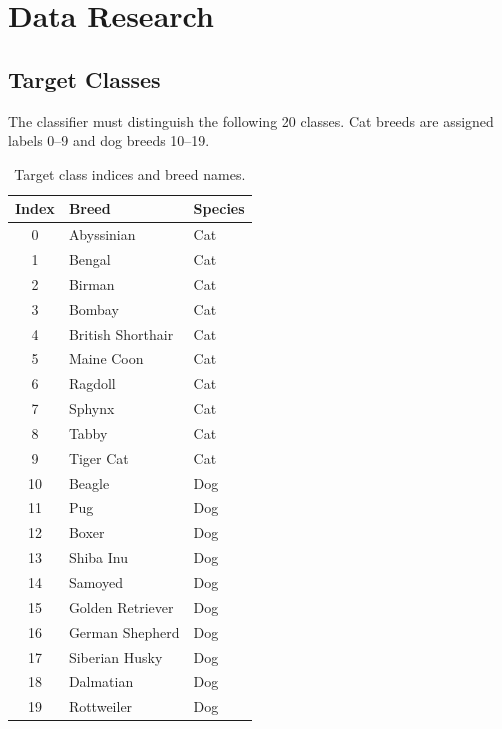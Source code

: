 \documentclass[10pt,twocolumn,letterpaper]{article}
\begin{document}
\section{Data Research}

\subsection{Target Classes}

The classifier must distinguish the following 20 classes. Cat breeds are assigned labels 0--9 and dog breeds 10--19.

\begin{table}[h]
\centering
\small
\caption{Target class indices and breed names.}
\label{tab:classes}
\begin{tabular}{cll}
\toprule
\textbf{Index} & \textbf{Breed} & \textbf{Species} \\
\midrule
0  & Abyssinian        & Cat \\
1  & Bengal            & Cat \\
2  & Birman            & Cat \\
3  & Bombay            & Cat \\
4  & British Shorthair & Cat \\
5  & Maine Coon        & Cat \\
6  & Ragdoll           & Cat \\
7  & Sphynx            & Cat \\
8  & Tabby             & Cat \\
9  & Tiger Cat         & Cat \\
\midrule
10 & Beagle            & Dog \\
11 & Pug               & Dog \\
12 & Boxer             & Dog \\
13 & Shiba Inu         & Dog \\
14 & Samoyed           & Dog \\
15 & Golden Retriever  & Dog \\
16 & German Shepherd   & Dog \\
17 & Siberian Husky    & Dog \\
18 & Dalmatian         & Dog \\
19 & Rottweiler        & Dog \\
\bottomrule
\end{tabular}
\end{table}
\end{document}
